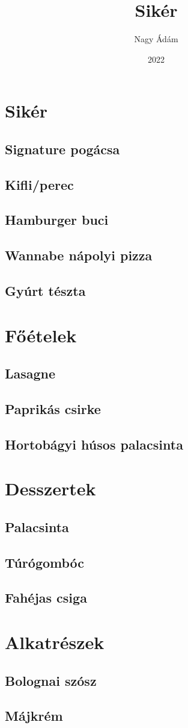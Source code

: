 \documentclass[12pt,a5paper,pagesize,openright]{book}
\title{Sikér}
\author{Nagy Ádám}
\date{2022}
\begin{document}
\frontmatter
\maketitle

\mainmatter
\chapter{Sikér}
\section{Signature pogácsa}
\lipsum[1-4]

\section{Kifli/perec}
\lipsum[1-4]

\section{Hamburger buci}
\section{Wannabe nápolyi pizza}
\section{Gyúrt tészta}



\chapter{Főételek}
\section{Lasagne}
\lipsum[1-4]

\section{Paprikás csirke}
\section{Hortobágyi húsos palacsinta}

\chapter{Desszertek}
\section{Palacsinta}
\section{Túrógombóc}
\section{Fahéjas csiga}


\chapter{Alkatrészek}
\section{Bolognai szósz}
\section{Májkrém}
\end{document}
